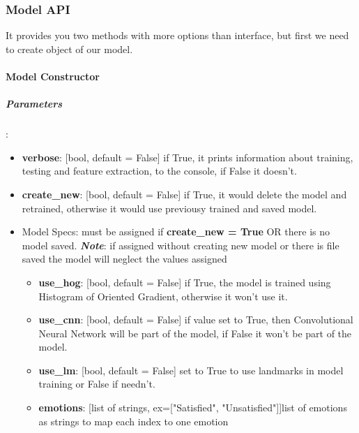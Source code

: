 
\subsubsection{Model API}
It provides you two methods with more options than interface, but first we need to create object of our model.
\bigbreak

\paragraph{Model Constructor}

\subparagraph{Parameters}:
\begin{changemargin}{0.5cm}{0cm}
\begin{itemize}
	\item \textbf{verbose}: [bool, default = False] if True, it prints information about training, testing and feature extraction, to the console, if False it doesn't.
	
	\item \textbf{create\_new}: [bool, default = False] if True, it would delete the model and retrained, otherwise it would use previousy trained and saved model.
	
	\item Model Specs: must be assigned if \textbf{create\_new = True} OR there is no model saved.
		\newline
		\textbf{\textit{Note}}: if assigned without creating new model or there is file saved the model will neglect the values assigned
		\begin{itemize}
			\item \textbf{use\_hog}: [bool, default = False] if True, the model is trained using  Histogram of Oriented Gradient, otherwise it won't use it.

			\item \textbf{use\_cnn}: [bool, default = False] if value set to True, then Convolutional Neural Network will be part of the model, if False it won't be part of the model.
			
			\item \textbf{use\_lm}: [bool, default = False] set to True to use landmarks in model training or False if needn't.
			
			\item \textbf{emotions}: [list of strings, ex=["Satisfied", "Unsatisfied"]]list of emotions as strings to map each index to one emotion 
		\end{itemize}
		
\end{itemize}
\end{changemargin}

